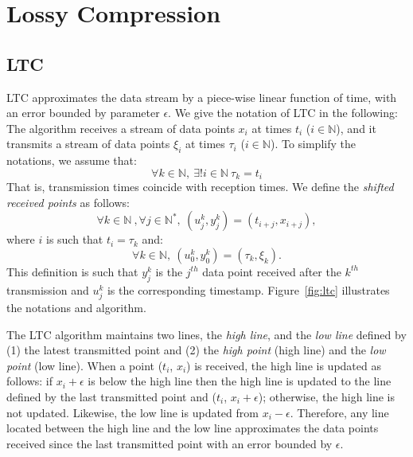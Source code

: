 \section{Lossy Compression}

\subsection{LTC}
LTC approximates the data stream by a piece-wise linear function of time, with
an error bounded by parameter $\epsilon$. We give the notation of LTC in the
following: The algorithm receives a stream of data points $x_i$ at times $t_i$
($i \in \mathbb{N}$), and it transmits a stream of data points $\xi_i$ at times
$\tau_i$ ($i \in \mathbb{N}$). To simplify the notations, we assume that:
\begin{equation*}
\forall k \in \mathbb{N}, \  \exists ! i \in \mathbb{N} \  \tau_k = t_i
\end{equation*}
That is, transmission times coincide with reception times.
We define the \emph{shifted received points} as follows:
\begin{equation*}
\forall k \in \mathbb{N}\ , \forall j \in \mathbb{N^*},\ (u^k_j, y^k_j) = (t_{i+j}, x_{i+j}), 
\end{equation*}
where $i$ is such that $t_i = \tau_k$ and:
\begin{equation*}
\forall k \in \mathbb{N},\  (u^k_0, y^k_0) = (\tau_k, \xi_k).
\end{equation*}
This definition is such that $y^k_j$ is the $j^{th}$ data point received
after the $k^{th}$ transmission and $u^k_j$ is the corresponding timestamp.
Figure~\ref{fig:ltc} illustrates the notations and algorithm.

The LTC algorithm maintains two lines, the \emph{high line}, and the \emph{low
line} defined by (1) the latest transmitted point and (2) the \emph{high point}
(high line) and the \emph{low point} (low line). When a point ($t_i$, $x_i$) is
received, the high line is updated as follows: if $x_i+\epsilon$ is below the
high line then the high line is updated to the line defined by the last
transmitted point and ($t_i$, $x_i+\epsilon$); otherwise, the high line is not
updated. Likewise, the low line is updated from $x_i-\epsilon$. Therefore, any
line located between the high line and the low line approximates the data points
received since the last transmitted point with an error bounded by $\epsilon$.


